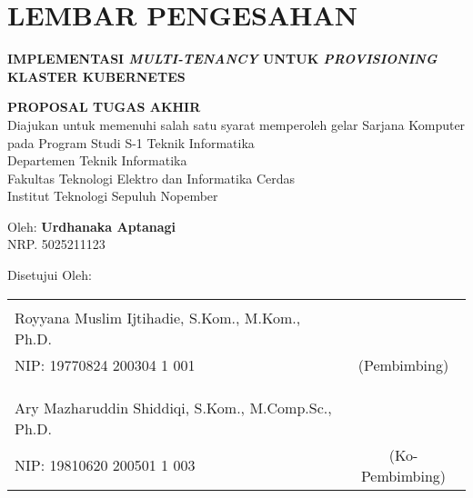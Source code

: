 \chapter*{LEMBAR PENGESAHAN}
\thispagestyle{empty}

\begin{center}
  \textbf{IMPLEMENTASI \emph{MULTI-TENANCY} UNTUK \emph{PROVISIONING} KLASTER KUBERNETES}
\end{center}

\begingroup
\small

\begin{center}
  \textbf{PROPOSAL TUGAS AKHIR} \\
  Diajukan untuk memenuhi salah satu syarat memperoleh gelar
  Sarjana Komputer pada
  Program Studi S-1 Teknik Informatika \\
  Departemen Teknik Informatika \\
  Fakultas Teknologi Elektro dan Informatika Cerdas \\
  Institut Teknologi Sepuluh Nopember
\end{center}

\begin{center}
  Oleh: \textbf{Urdhanaka Aptanagi} \\
  NRP. 5025211123
\end{center}

\begin{center}
  Disetujui Oleh:
\end{center}

\vspace{10ex}

\begingroup
\setlength{\tabcolsep}{0pt}

\noindent
\begin{tabularx}{\textwidth}{X c}
        &                 \\
  Royyana Muslim Ijtihadie, S.Kom., M.Kom., Ph.D.     &                 \\
  NIP: 19770824 200304 1 001                          & (Pembimbing)    \\
                                                      &                 \\
                                                      &                 \\
                                                      &                 \\
  Ary Mazharuddin Shiddiqi, S.Kom., M.Comp.Sc., Ph.D. &                 \\
  NIP: 19810620 200501 1 003                          & (Ko-Pembimbing) \\
\end{tabularx}
\endgroup

